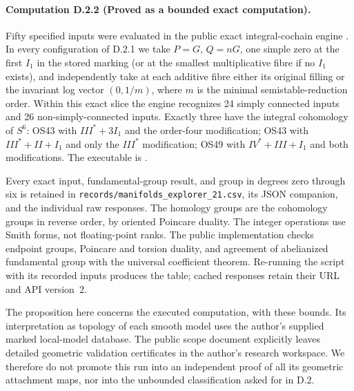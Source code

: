 \paragraph{Computation D.2.2 (Proved as a bounded exact computation).}
Fifty specified inputs were evaluated in the public exact integral-cochain engine
\cite{manExplorer26}. In every configuration of D.2.1 we take
$P=G$, $Q=nG$, one simple zero at the first $I_1$ in the stored
marking (or at the smallest multiplicative fibre if no $I_1$ exists),
and independently take at each additive fibre either its original
filling or the invariant log vector $(0,1/m)$, where $m$ is the
minimal semistable-reduction order. Within this exact slice the
engine recognizes 24 simply connected inputs and 26 non-simply-connected
inputs. Exactly three have the integral cohomology of $S^6$:
OS43 with $III^*+3I_1$ and the order-four modification;
OS43 with $III^*+II+I_1$ and only the $III^*$ modification;
OS49 with $IV^*+III+I_1$ and both modifications. The executable is
.

Every exact input, fundamental-group result, and group in degrees
zero through six is retained in
\texttt{records/manifolds\_explorer\_21.csv}, its JSON companion,
and the individual raw responses. The homology groups are the
cohomology groups in reverse order, by oriented Poincare duality.
The integer operations use Smith forms, not floating-point ranks.
The public implementation checks endpoint groups, Poincare and
torsion duality, and agreement of abelianized fundamental group
with the universal coefficient theorem. Re-running the script
with its recorded inputs produces the table; cached responses
retain their URL and API version~2.

The proposition here concerns the executed computation, with these
bounds. Its interpretation as topology of each smooth model uses
the author's supplied marked local-model database. The public scope
document explicitly leaves detailed geometric validation certificates
in the author's research workspace. We therefore do not promote this
run into an independent proof of all its geometric attachment maps,
nor into the unbounded classification asked for in D.2.

